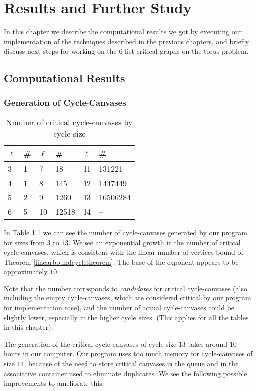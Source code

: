 \chapter{Results and Further Study}

In this chapter we describe the computational results we got by executing our implementation
of the techniques described in the previous chapters, and briefly discuss next steps for
working on the 6-list-critical graphs on the torus problem.

\section{Computational Results}
\subsection{Generation of Cycle-Canvases}

\begin{table}[h]
\label{tab:cyclecanvases}
\centering
\begin{tabular}{l | l || l | l || l | l}
$\ell$ & \# & $\ell$ & \# & $\ell$ & \# \\
\hline
3 & 1 & 7  & 18    & 11 & 131221\\ 
4 & 1 & 8  & 145   & 12 & 1447449 \\
5 & 2 & 9  & 1260  & 13 & 16506284 \\ 
6 & 5 & 10 & 12518 & 14 & -- 
\end{tabular}
\caption{Number of critical cycle-canvases by cycle size}
\end{table}

In Table \ref{tab:cyclecanvases} we can see the number of cycle-canvases generated by our program
for sizes from $3$ to $13$. 
We see an exponential growth in the number of critical cycle-canvases, which is consistent with the
linear number of vertices bound of Theorem \ref{linearboundcycletheorem}. 
The base of the exponent appears to be approximately $10$.

Note that the number corresponds to \emph{candidates} for critical cycle-canvases (also including
the empty cycle-canvases, which are considered critical by our program for implementation ease), 
and the number of actual cycle-canvases could be slightly lower, especially in the higher cycle 
sizes. (This applies for all the tables in this chapter).

The generation of the critical cycle-canvases of cycle size $13$ takes around 10 hours in our 
computer. Our program uses too much memory for cycle-canvases of size $14$, because of the need to
store critical canvases in the queue and in the associative container used to eliminate duplicates.
We see the following possible improvements to ameliorate this:

